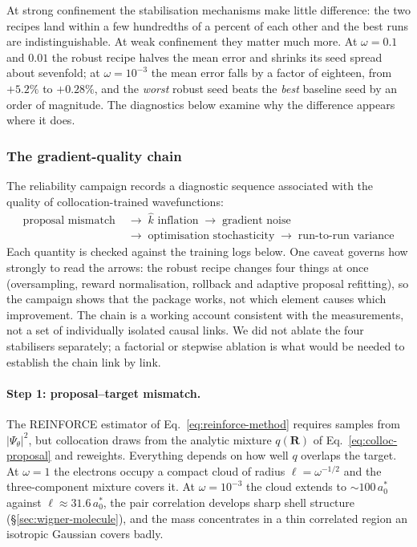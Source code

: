 At strong confinement the stabilisation mechanisms make little difference: the two recipes land
within a few hundredths of a percent of each other and the best runs are indistinguishable.
At weak confinement they matter much more. At $\omega=0.1$ and $0.01$ the robust recipe
halves the mean error and shrinks its seed spread about sevenfold; at $\omega=10^{-3}$ the
mean error falls by a factor of eighteen, from $+5.2\%$ to $+0.28\%$, and the \emph{worst}
robust seed beats the \emph{best} baseline seed by an order of magnitude. The diagnostics
below examine why the difference appears where it does.


\subsubsection{The gradient-quality chain}
\label{sec:gradient-chain}

The reliability campaign records a diagnostic sequence associated with
the quality of collocation-trained wavefunctions:
\begin{equation}
\boxed{\;\begin{aligned}
  \text{proposal mismatch}
  &\;\longrightarrow\;
  \hat{k}\text{ inflation}
  \;\longrightarrow\;
  \text{gradient noise}\\
  &\;\longrightarrow\;
  \text{optimisation stochasticity}
  \;\longrightarrow\;
  \text{run-to-run variance}
\end{aligned}\;}
\label{eq:chain}
\end{equation}
Each quantity is checked against the training logs below. One caveat governs how strongly to
read the arrows: the robust recipe changes four things at once (oversampling, reward
normalisation, rollback and adaptive proposal refitting), so the campaign shows that the
package works, not which element causes which improvement. The chain is a working account
consistent with the measurements, not a set of individually isolated causal links.
We did not ablate the four stabilisers separately; a factorial or stepwise ablation is what
would be needed to establish the chain link by link.

\paragraph{Step 1: proposal--target mismatch.}
The REINFORCE estimator of Eq.~\eqref{eq:reinforce-method} requires samples from
$|\Psi_\theta|^2$, but collocation draws from the analytic mixture
$q(\mathbf R)$ of Eq.~\eqref{eq:colloc-proposal} and reweights. Everything depends on how
well $q$ overlaps the target. At $\omega=1$ the electrons occupy a compact cloud of radius
$\ell=\omega^{-1/2}$ and the three-component mixture covers it. At $\omega=10^{-3}$ the cloud
extends to ${\sim}100\,a_0^\ast$ against $\ell\approx31.6\,a_0^\ast$, the pair correlation
develops sharp shell structure (\S\ref{sec:wigner-molecule}), and the mass concentrates in a
thin correlated region an isotropic Gaussian covers badly.

